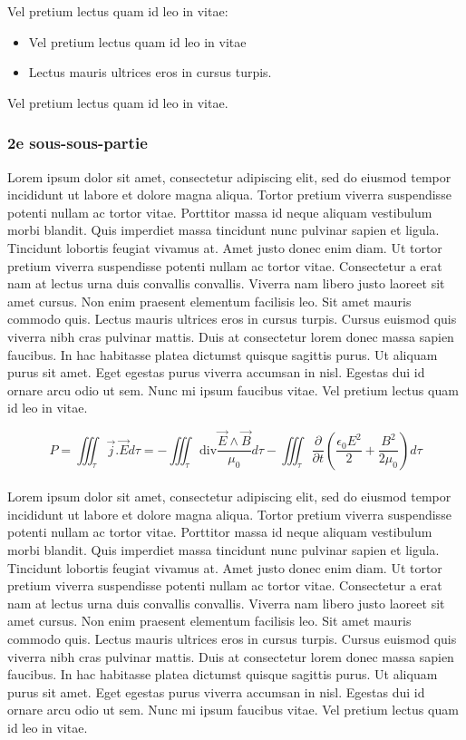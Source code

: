 
Vel pretium lectus quam id leo in vitae:
\begin{itemize}
	\item Vel pretium lectus quam id leo in vitae
	\item Lectus mauris ultrices eros in cursus turpis.
\end{itemize}

Vel pretium lectus quam id leo in vitae.

\subsubsection{2e sous-sous-partie}

Lorem ipsum dolor sit amet, consectetur adipiscing elit, sed do eiusmod
tempor incididunt ut labore et dolore magna aliqua. Tortor pretium
viverra suspendisse potenti nullam ac tortor vitae. Porttitor massa id
neque aliquam vestibulum morbi blandit. Quis imperdiet massa tincidunt
nunc pulvinar sapien et ligula. Tincidunt lobortis feugiat vivamus
at. Amet justo donec enim diam. Ut tortor pretium viverra suspendisse
potenti nullam ac tortor vitae. Consectetur a erat nam at lectus urna
duis convallis convallis. Viverra nam libero justo laoreet sit amet
cursus. Non enim praesent elementum facilisis leo. Sit amet mauris
commodo quis. Lectus mauris ultrices eros in cursus turpis. Cursus euismod
quis viverra nibh cras pulvinar mattis. Duis at consectetur lorem donec
massa sapien faucibus. In hac habitasse platea dictumst quisque sagittis
purus. Ut aliquam purus sit amet. Eget egestas purus viverra accumsan
in nisl. Egestas dui id ornare arcu odio ut sem. Nunc mi ipsum faucibus
vitae. Vel pretium lectus quam id leo in vitae.

\[
	P = \iiint_\tau \vec j . \vec E d \tau
	= - \iiint_\tau \text{div} \frac{\vec E \wedge \vec B}{\mu_0} d \tau
	- \iiint_\tau \frac{\partial}{\partial t} (\frac{\epsilon_0 E^2}{2} + \frac{B^2}{2 \mu_0}) d \tau
\]

\paragraph{}
Lorem ipsum dolor sit amet, consectetur adipiscing elit, sed do eiusmod
tempor incididunt ut labore et dolore magna aliqua. Tortor pretium
viverra suspendisse potenti nullam ac tortor vitae. Porttitor massa id
neque aliquam vestibulum morbi blandit. Quis imperdiet massa tincidunt
nunc pulvinar sapien et ligula. Tincidunt lobortis feugiat vivamus
at. Amet justo donec enim diam. Ut tortor pretium viverra suspendisse
potenti nullam ac tortor vitae. Consectetur a erat nam at lectus urna
duis convallis convallis. Viverra nam libero justo laoreet sit amet
cursus. Non enim praesent elementum facilisis leo. Sit amet mauris
commodo quis. Lectus mauris ultrices eros in cursus turpis. Cursus euismod
quis viverra nibh cras pulvinar mattis. Duis at consectetur lorem donec
massa sapien faucibus. In hac habitasse platea dictumst quisque sagittis
purus. Ut aliquam purus sit amet. Eget egestas purus viverra accumsan
in nisl. Egestas dui id ornare arcu odio ut sem. Nunc mi ipsum faucibus
vitae. Vel pretium lectus quam id leo in vitae.

